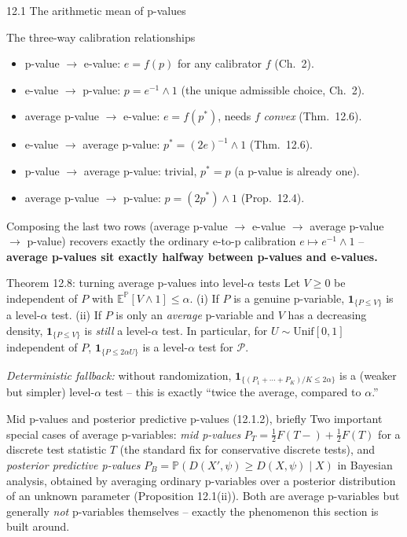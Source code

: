 \documentclass[aspectratio=169,10pt]{beamer}
\newcommand{\PP}{\mathbb{P}}
\newcommand{\EE}{\mathbb{E}}
\newcommand{\calP}{\mathcal{P}}
\newcommand{\indic}[1]{\mathbf{1}_{\{#1\}}}
\begin{document}
\begin{frame}[allowframebreaks]{12.1 The arithmetic mean of p-values}
  \begin{block}{The three-way calibration relationships}
    \begin{itemize}
      \item p-value $\to$ e-value: $e=f(p)$ for any calibrator $f$ (Ch.\ 2).
      \item e-value $\to$ p-value: $p = e^{-1}\wedge1$ (the unique admissible choice, Ch.\ 2).
      \item average p-value $\to$ e-value: $e=f(p^*)$, needs $f$ \emph{convex} (Thm.\ 12.6).
      \item e-value $\to$ average p-value: $p^*=(2e)^{-1}\wedge1$ (Thm.\ 12.6).
      \item p-value $\to$ average p-value: trivial, $p^*=p$ (a p-value is already one).
      \item average p-value $\to$ p-value: $p=(2p^*)\wedge1$ (Prop.\ 12.4).
    \end{itemize}
    Composing the last two rows (average p-value $\to$ e-value $\to$ average p-value $\to$ p-value) recovers exactly the ordinary e-to-p calibration $e\mapsto e^{-1}\wedge1$ -- \textbf{average p-values sit exactly halfway between p-values and e-values.}
  \end{block}

  \framebreak

  \begin{block}{Theorem 12.8: turning average p-values into level-$\alpha$ tests}
    Let $V\ge0$ be independent of $P$ with $\EE^\PP[V\wedge1]\le\alpha$. (i) If $P$ is a genuine p-variable, $\indic{P\le V}$ is a level-$\alpha$ test. (ii) If $P$ is only an \emph{average} p-variable and $V$ has a decreasing density, $\indic{P\le V}$ is \emph{still} a level-$\alpha$ test. In particular, for $U\sim\mathrm{Unif}[0,1]$ independent of $P$, $\indic{P\le2\alpha U}$ is a level-$\alpha$ test for $\calP$.

    \emph{Deterministic fallback:} without randomization, $\indic{(P_1+\cdots+P_K)/K\le2\alpha}$ is a (weaker but simpler) level-$\alpha$ test -- this is exactly ``twice the average, compared to $\alpha$.''
  \end{block}

  \begin{block}{Mid p-values and posterior predictive p-values (12.1.2), briefly}
    Two important special cases of average p-variables: \emph{mid p-values} $P_T=\tfrac12F(T-)+\tfrac12F(T)$ for a discrete test statistic $T$ (the standard fix for conservative discrete tests), and \emph{posterior predictive p-values} $P_B=\PP(D(X',\psi)\ge D(X,\psi)\mid X)$ in Bayesian analysis, obtained by averaging ordinary p-variables over a posterior distribution of an unknown parameter (Proposition 12.1(ii)). Both are average p-variables but generally \emph{not} p-variables themselves -- exactly the phenomenon this section is built around.
  \end{block}
\end{frame}
\end{document}
